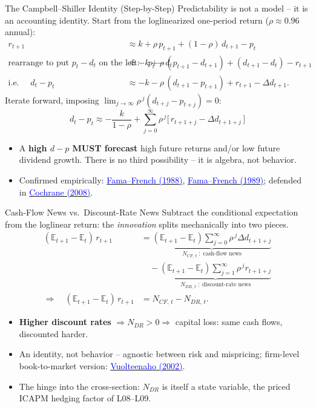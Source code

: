 \documentclass{beamer}
\newcommand{\E}{\mathbb{E}}
\begin{document}
\begin{frame}{The Campbell--Shiller Identity (Step-by-Step)}
\small
Predictability is not a model -- it is an \alert{accounting identity}. Start from the loglinearized one-period return ($\rho \approx 0.96$ annual):
\begin{align*}
  r_{t+1} &\approx k + \rho\,p_{t+1} + (1-\rho)\,d_{t+1} - p_t \\[2pt]
  \text{rearrange to put } p_t-d_t \text{ on the left:}\quad
  p_t - d_t &\approx -k + \rho\,(p_{t+1}-d_{t+1}) + (d_{t+1}-d_t) - r_{t+1}\\[2pt]
  \text{i.e. } \quad d_t - p_t &\approx -k - \rho\,(d_{t+1}-p_{t+1}) + r_{t+1} - \Delta d_{t+1}.
\end{align*}
Iterate forward, imposing $\lim_{j\to\infty}\rho^{\,j}(d_{t+j}-p_{t+j})=0$:
\begin{equation*}
  \boxed{\;d_t - p_t \approx -\frac{k}{1-\rho} + \sum_{j=0}^{\infty}\rho^{\,j}\bigl[\,r_{t+1+j} - \Delta d_{t+1+j}\,\bigr]\;}
\end{equation*}
\begin{itemize}
  \item A \textbf{high $d-p$ MUST forecast} high future returns and/or low future dividend growth. There is no third possibility -- it is algebra, not behavior.
  \item Confirmed empirically: \href{https://doi.org/10.1016/0304-405X(88)90020-7}{\textcolor{blue}{Fama--French (1988)}}, \href{https://doi.org/10.1016/0304-405X(89)90095-0}{\textcolor{blue}{Fama--French (1989)}}; defended in \href{https://doi.org/10.1093/rfs/hhm046}{\textcolor{blue}{Cochrane (2008)}}.
\end{itemize}
\end{frame}

\begin{frame}{Cash-Flow News vs.\ Discount-Rate News}
\small
Subtract the conditional expectation from the loglinear return: the \textit{innovation} splits mechanically into two pieces.
\begin{align*}
  (\E_{t+1}-\E_t)\,r_{t+1}
  &= \underbrace{(\E_{t+1}-\E_t)\sum_{j=0}^{\infty}\rho^{\,j}\Delta d_{t+1+j}}_{N_{CF,\,t}\;:\;\text{cash-flow news}} \\
  &\quad - \underbrace{(\E_{t+1}-\E_t)\sum_{j=1}^{\infty}\rho^{\,j} r_{t+1+j}}_{N_{DR,\,t}\;:\;\text{discount-rate news}} \\
  \Longrightarrow\quad (\E_{t+1}-\E_t)\,r_{t+1} &= N_{CF,\,t} - N_{DR,\,t}.
\end{align*}
\begin{itemize}
  \item \textbf{Higher discount rates} $\Rightarrow N_{DR}>0 \Rightarrow$ \alert{capital loss}: same cash flows, discounted harder.
  \item An identity, not behavior -- agnostic between risk and mispricing; firm-level book-to-market version: \href{https://doi.org/10.1111/1540-6261.00437}{\textcolor{blue}{Vuolteenaho (2002)}}.
  \item \alert{The hinge into the cross-section}: $N_{DR}$ is itself a state variable, the priced ICAPM hedging factor of L08--L09.
\end{itemize}
\end{frame}
\end{document}
